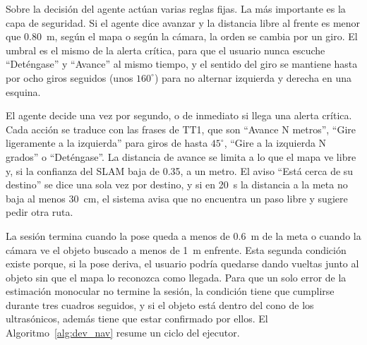 Sobre la decisión del agente actúan varias reglas fijas. La más importante es la capa de
seguridad. Si el agente dice avanzar y la distancia libre al frente es menor que
0.80~m, según el mapa o según la cámara, la orden se cambia por un giro. El umbral es el
mismo de la alerta crítica, para que el usuario nunca escuche ``Deténgase'' y ``Avance''
al mismo tiempo, y el sentido del giro se mantiene hasta por ocho giros seguidos (unos
$160^\circ$) para no alternar izquierda y derecha en una esquina.

El agente decide una vez por segundo, o de inmediato si llega una alerta crítica. Cada
acción se traduce con las frases de TT1, que son ``Avance N metros'', ``Gire ligeramente
a la izquierda'' para giros de hasta $45^\circ$, ``Gire a la izquierda N grados'' o
``Deténgase''. La distancia de avance se limita a lo que el mapa ve libre y, si la
confianza del SLAM baja de 0.35, a un metro. El aviso ``Está cerca de su destino'' se
dice una sola vez por destino, y si en 20~s la distancia a la meta no baja al menos
30~cm, el sistema avisa que no encuentra un paso libre y sugiere pedir otra ruta.

La sesión termina cuando la pose queda a menos de 0.6~m de la meta o cuando la cámara ve
el objeto buscado a menos de 1~m enfrente. Esta segunda condición existe porque, si la
pose deriva, el usuario podría quedarse dando vueltas junto al objeto sin que el mapa lo
reconozca como llegada. Para que un solo error de la estimación monocular no termine la
sesión, la condición tiene que cumplirse durante tres cuadros seguidos, y si el objeto
está dentro del cono de los ultrasónicos, además tiene que estar confirmado por ellos.
El Algoritmo~\ref{alg:dev_nav} resume un ciclo del ejecutor.

